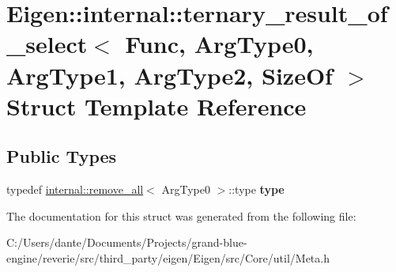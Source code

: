 \hypertarget{struct_eigen_1_1internal_1_1ternary__result__of__select}{}\section{Eigen\+::internal\+::ternary\+\_\+result\+\_\+of\+\_\+select$<$ Func, Arg\+Type0, Arg\+Type1, Arg\+Type2, Size\+Of $>$ Struct Template Reference}
\label{struct_eigen_1_1internal_1_1ternary__result__of__select}
\subsection*{Public Types}
\begin{DoxyCompactItemize}
\item 
\mbox{\label{struct_eigen_1_1internal_1_1ternary__result__of__select_afdca930a891955c2a1558818c245e606}} 
typedef \mbox{\hyperlink{struct_eigen_1_1internal_1_1remove__all}{internal\+::remove\+\_\+all}}$<$ Arg\+Type0 $>$\+::type {\bfseries type}
\end{DoxyCompactItemize}


The documentation for this struct was generated from the following file\+:\begin{DoxyCompactItemize}
\item 
C\+:/\+Users/dante/\+Documents/\+Projects/grand-\/blue-\/engine/reverie/src/third\+\_\+party/eigen/\+Eigen/src/\+Core/util/Meta.\+h\end{DoxyCompactItemize}

